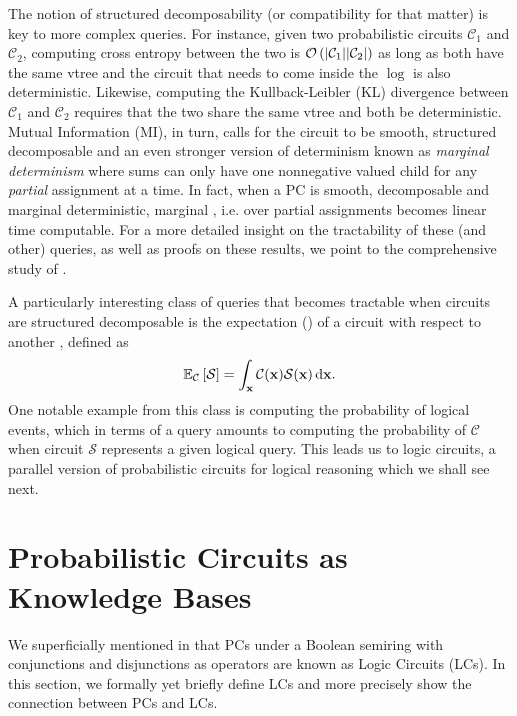 The notion of structured decomposability (or compatibility for that matter) is key to more complex
queries. For instance, given two probabilistic circuits $\mathcal{C}_1$ and $\mathcal{C}_2$,
computing cross entropy between the two is $\mathcal{O}\left(|\mathcal{C}_1||\mathcal{C}_2|\right)$ as
long as both have the same vtree and the circuit that needs to come inside the $\log$ is also
deterministic. Likewise, computing the Kullback-Leibler (KL) divergence between $\mathcal{C}_1$ and
$\mathcal{C}_2$ requires that the two share the same vtree and both be deterministic. Mutual
Information (MI), in turn, calls for the circuit to be smooth, structured decomposable and an even
stronger version of determinism known as \emph{marginal determinism} where sums can only have one
nonnegative valued child for any \emph{partial} assignment at a time. In fact, when a PC is smooth,
decomposable and marginal deterministic, marginal \map{}, i.e. \map{} over partial assignments
becomes linear time computable. For a more detailed insight on the tractability of these (and
other) queries, as well as proofs on these results, we point to the comprehensive study of
\citet{vergari21}.

A particularly interesting class of queries that becomes tractable when circuits are structured
decomposable is the expectation (\expc{}) of a circuit with respect to another \citep{choi20},
defined as
\begin{equation}
  \mathbb{E}_\mathcal{C}\left[\mathcal{S}\right]=\int_{\mathbf{x}}\mathcal{C}(\mathbf{x})\mathcal{S}(\mathbf{x})\mathop{}\!\mathrm{d}\mathbf{x}.
  \label{eq:exp}
\end{equation}
One notable example from this class is computing the probability of logical events, which in terms
of a \expc{} query amounts to computing the probability of $\mathcal{C}$ when circuit $\mathcal{S}$
represents a given logical query. This leads us to logic circuits, a parallel version of
probabilistic circuits for logical reasoning which we shall see next.

\section{Probabilistic Circuits as Knowledge Bases}
\label{sec:pckb}

We superficially mentioned in  that PCs under a Boolean semiring with
conjunctions and disjunctions as operators are known as Logic Circuits (LCs). In this section, we
formally yet briefly define LCs and more precisely show the connection between PCs and LCs.

